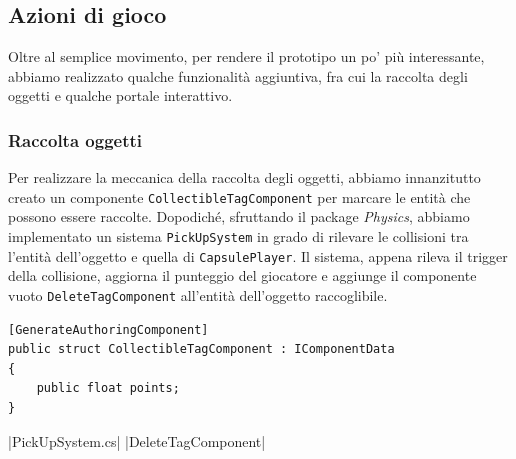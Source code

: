 \subsection{Azioni di gioco}
Oltre al semplice movimento, per rendere il prototipo un po' più interessante, abbiamo realizzato qualche funzionalità aggiuntiva, fra cui la raccolta degli oggetti e qualche portale interattivo.

\subsubsection{Raccolta oggetti}

Per realizzare la meccanica della raccolta degli oggetti, abbiamo innanzitutto creato un componente \verb|CollectibleTagComponent| per marcare le entità che possono essere raccolte.
Dopodiché, sfruttando il package \emph{Physics}, abbiamo implementato un sistema \verb|PickUpSystem| in grado di rilevare le collisioni tra l'entità dell'oggetto e quella di \verb|CapsulePlayer|. Il sistema, appena rileva il trigger della collisione, aggiorna il punteggio del giocatore e aggiunge il componente vuoto \verb|DeleteTagComponent| all'entità dell'oggetto raccoglibile.\\

\begin{lstlisting}[caption={Componente che marca un'entità come raccoglibile.}, label={lst:prototipo-collectible}, language={[Sharp]C}]
[GenerateAuthoringComponent]
public struct CollectibleTagComponent : IComponentData
{
    public float points;
}
\end{lstlisting}

|PickUpSystem.cs|
|DeleteTagComponent|

